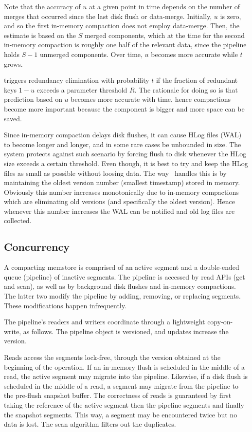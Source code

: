 Note that the accuracy of $u$ at a given point in time depends on the number of merges that occurred since the last disk flush
or data-merge.
Initially, $u$ is zero, and so the first in-memory compaction does not employ data-merge.
Then, the estimate is based on the $S$ merged components, which at the time for the second in-memory compaction
is roughly one half of the relevant data, since the pipeline holds $S-1$ unmerged components. 
Over time, $u$ becomes more accurate while $t$ grows. 

\adp\/ triggers redundancy elimination with probability $t$ if the fraction of redundant keys $1-u$ exceeds a parameter 
threshold $R$. The rationale for doing so is that prediction based on $u$ becomes more accurate with time, hence 
compactions become more important because the component is bigger and more space can be saved.

 Since in-memory compaction delays disk flushes, it can cause HLog files (WAL) to become longer and longer, and in some rare cases be unbounded in size. The system protects against such scenario by forcing flush to disk whenever the HLog size exceeds a certain threshold. Even though, it is best to try and keep the HLog files as small as possible without loosing data. The way \sys\ handles this is by maintaining the oldest version number  (smallest timestamp) stored in memory. Obviously this number increases monotonically due to in-memory compactions which are eliminating old versions (and specifically the oldest version). Hence whenever this number increases the WAL can be notified and old log files are collected.

\subsection{Concurrency} \label{ssec:impl-details}

A compacting memstore is comprised of an active segment and a double-ended queue (pipeline) of inactive segments. 
The pipeline is accessed by read APIs (get and scan), as well as by background disk flushes and in-memory compactions. 
The latter two modify the pipeline by adding, removing, or replacing segments. These modifications happen infrequently.     

The pipeline's readers and writers coordinate through a lightweight copy-on-write, as follows.
The pipeline object is versioned, and updates increase the version.

Reads access the segments lock-free, through the version obtained at the beginning of the operation. 
If an in-memory flush is scheduled in the middle of a read, the active segment may migrate into the pipeline. 
Likewise, if a disk flush is scheduled in the middle of a read, a segment may migrate from the pipeline to the pre-flush snapshot buffer. 
The correctness of reads  is guaranteed by first taking the reference of the active segment then the pipeline segments and finally the snapshot segments. This way, a segment may be encountered twice but no data is 
lost. The scan algorithm filters out the duplicates. 

